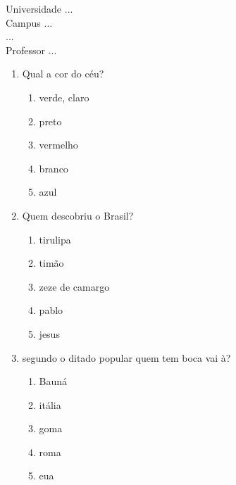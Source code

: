 \documentclass[10pt,a4paper,twocolumn]{report}
\begin{document}
\begin{flushleft}
Universidade ...\\
Campus ...\\
...\\
Professor ...\\
\end{flushleft}




 \begin{enumerate} 
    \item  Qual a cor do céu?





    \begin{enumerate}
    \item  verde, claro

\item  preto

\item  vermelho

\item  branco

\item  azul


    \end{enumerate} 
    \item  Quem descobriu o Brasil?





    \begin{enumerate}
    \item  tirulipa

\item  timão

\item  zeze de camargo

\item  pablo

\item  jesus


    \end{enumerate} 
    \item  segundo o ditado popular quem tem boca vai à?





    \begin{enumerate}
    \item  Bauná

\item  itália

\item  goma

\item  roma

\item  eua


    \end{enumerate}\end{enumerate} 
\end{document}
